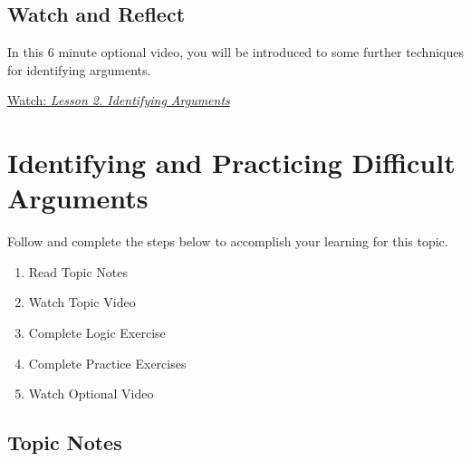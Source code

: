 \documentclass[
]{book}
\providecommand{\tightlist}{%
  \setlength{\itemsep}{0pt}\setlength{\parskip}{0pt}}
\begin{document}
\begin{reflect}
\end{reflect}

\hypertarget{watch-and-reflect-17}{%
\subsection*{Watch and Reflect}\label{watch-and-reflect-17}}

\begin{reflect}
In this 6 minute optional video, you will be introduced to some further techniques for identifying arguments.

\href{https://www.youtube.com/watch?v=lYiEj5z8le8}{Watch: \emph{Lesson 2. Identifying Arguments}}
\end{reflect}

\hypertarget{identifying-and-practicing-difficult-arguments}{%
\section{Identifying and Practicing Difficult Arguments}\label{identifying-and-practicing-difficult-arguments}}

Follow and complete the steps below to accomplish your learning for this topic.

\begin{enumerate}
\def\labelenumi{\arabic{enumi}.}
\tightlist
\item
  Read Topic Notes\\
\item
  Watch Topic Video\\
\item
  Complete Logic Exercise\\
\item
  Complete Practice Exercises\\
\item
  Watch Optional Video
\end{enumerate}

\hypertarget{topic-notes-11}{%
\subsection*{Topic Notes}\label{topic-notes-11}}
\end{document}
